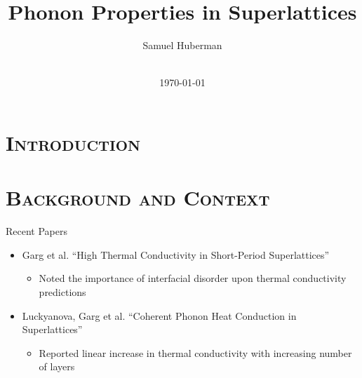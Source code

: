 \documentclass[xcolor=x11names,compress]{beamer}
\renewcommand{\(}{\begin{columns}}
\renewcommand{\)}{\end{columns}}
\newcommand{\<}[1]{\begin{column}{#1}}
\renewcommand{\>}{\end{column}}
\begin{document}
\section{\scshape Introduction}
\begin{frame}
\title{Phonon Properties in Superlattices}
\author{
	Samuel Huberman\\
}
\date{
	\\
	\vspace{1cm}
	\today
}
\titlepage
\end{frame}

\section{\scshape Background and Context}
\begin{frame}{Recent Papers}
\begin{itemize}
\item Garg et al. ``High Thermal Conductivity in Short-Period Superlattices''
\begin{itemize}
\item Noted the importance of interfacial disorder upon thermal conductivity predictions
\end{itemize}
\vspace{0.5cm}
\item Luckyanova, Garg et al. ``Coherent Phonon Heat Conduction in Superlattices'' 
\begin{itemize}
\item Reported linear increase in thermal conductivity with increasing number of layers
\end{itemize}
\end{itemize}
\end{frame}

\end{document}
